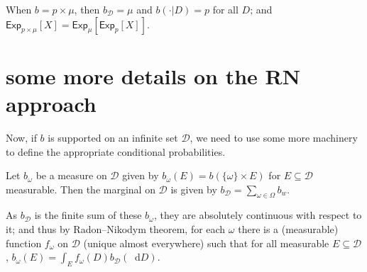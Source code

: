 \documentclass[a4paper]{article}
\newcommand\Exp{\mathsf{Exp}}
\newcommand\U{\mathfrak{U}} %
\newcommand{\D}{\mathcal{D}}
\newcommand{\Decs}{\mathcal{D}}
\newcommand\s{\mathsf{s}}
\newcommand{\n}{\mathsf{n}}
\renewcommand{\Re}{\mathbb{R}}
\renewcommand{\color}[1]{}
\newenvironment{colored}[1]{\leavevmode\color{#1}}{}
\newcommand*\diff{\mathop{}\!\mathrm{d}}
\newenvironment{CCM rewritten}
{\begingroup\color{blue}} %
{\endgroup}              %
\begin{document}
\begin{colored}{violet}
When $b=p\times\mu$, then $b_\Decs=\mu$ and $b(\cdot|D)=p$ for all $D$; and $\Exp_{p\times\mu}[X]=\Exp_{\mu}[\Exp_{p}[X]]$.

\begin{colored}{red}
	
\section{some more details on the RN approach}
%
%
%
%
%
%
Now, if $b$ is supported on an infinite set $\Decs$, we need to use some more machinery to define the appropriate conditional probabilities. 



Let $b_\omega$ be a measure on $\Decs$ given by $b_\omega(E)=b(\{\omega\}\times E)$ for $E\subseteq \Decs$ measurable. 
Then the marginal on $\Decs$ is given by  $b_\D=\sum_{\omega\in\Omega} b_w$. 

As $b_\D$ is the finite sum of these $b_\omega$, they are absolutely continuous with respect to it; and thus by Radon–Nikodym theorem, for each $\omega$ there is a (measurable) function $f_\omega$ on $\Decs$ (unique almost everywhere) such that for all measurable $E\subseteq\Decs$, $b_\omega(E)=\int_{E}f_\omega(D) b_\D(\diff D)$. 



\end{colored}
\end{colored}
\end{document}
